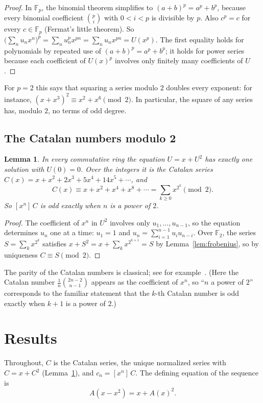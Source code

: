 \documentclass[11pt,a4paper]{article}
\newtheorem{lemma}[theorem]{Lemma}
\theoremstyle{definition}
\theoremstyle{remark}
\newcommand{\F}{\mathbb{F}}
\newcommand{\coeff}[2]{[x^{#1}]\,#2}
\begin{document}
\begin{proof}
In $\F_p$, the binomial theorem simplifies to $(a+b)^p=a^p+b^p$, because every binomial coefficient
$\binom pi$ with $0<i<p$ is divisible by $p$. Also $c^p=c$ for every $c\in\F_p$ (Fermat's little theorem). So
$\bigl(\sum_nu_nx^n\bigr)^p=\sum_nu_n^px^{pn}=\sum_nu_nx^{pn}=U(x^p)$. The first equality holds for polynomials by
repeated use of $(a+b)^p=a^p+b^p$; it holds for power series because each coefficient of $U(x)^p$ involves only finitely
many coefficients of $U$.
\end{proof}

For $p=2$ this says that squaring a series modulo $2$ doubles every exponent: for instance,
$(x+x^3)^2\equiv x^2+x^6\pmod2$. In particular, the square of any series has, modulo $2$, no terms of odd degree.

\subsection{The Catalan numbers modulo 2}
\begin{lemma}\label{lem:catalan}
In every commutative ring the equation $U=x+U^2$ has exactly one solution with $U(0)=0$. Over the integers it is the
Catalan series $C(x)=x+x^2+2x^3+5x^4+14x^5+\cdots$, and
\[
C(x)\equiv x+x^2+x^4+x^8+\cdots=\sum_{k\ge0}x^{2^k}\pmod 2 .
\]
So $\coeff{n}{C}$ is odd exactly when $n$ is a power of $2$.
\end{lemma}

\begin{proof}
The coefficient of $x^n$ in $U^2$ involves only $u_1,\dots,u_{n-1}$, so the equation determines $u_n$ one at a time:
$u_1=1$ and $u_n=\sum_{i=1}^{n-1}u_iu_{n-i}$. Over $\F_2$, the series $S=\sum_kx^{2^k}$ satisfies
$x+S^2=x+\sum_kx^{2^{k+1}}=S$ by Lemma~\ref{lem:frobenius}, so by uniqueness $C\equiv S\pmod2$.
\end{proof}
The parity of the Catalan numbers is classical; see for example~\cite{deutschsagan}. (Here the Catalan number
$\frac1{n}\binom{2n-2}{n-1}$ appears as the coefficient of $x^n$, so ``$n$ a power of $2$'' corresponds to the familiar
statement that the $k$-th Catalan number is odd exactly when $k+1$ is a power of $2$.)

\section{Results}\label{sec:results}

Throughout, $C$ is the Catalan series, the unique normalized series with $C=x+C^2$ (Lemma~\ref{lem:catalan}), and
$c_n=\coeff{n}{C}$. The defining equation of the sequence is
\begin{equation}\label{eq:def}
A(x-x^2)=x+A(x)^2 .
\end{equation}
\end{document}
